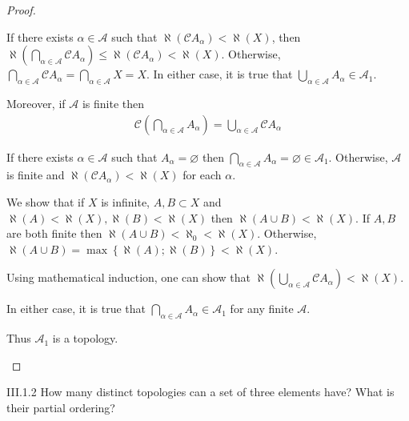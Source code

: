 \begin{proof}
\begin{enumerate}[label={(\alph*)},leftmargin=*]
		      If there exists \( \alpha \in \mathscr{A} \) such that \( \aleph(\mathscr{C}A_{\alpha}) < \aleph(X) \), then \( \aleph\left(\bigcap_{\alpha\in\mathscr{A}} \mathscr{C}A_{\alpha}\right) \le \aleph(\mathscr{C}A_{\alpha}) < \aleph(X) \). Otherwise, \( \bigcap_{\alpha\in\mathscr{A}} \mathscr{C}A_{\alpha} = \bigcap_{\alpha\in\mathscr{A}} X = X \). In either case, it is true that \( \bigcup_{\alpha\in\mathscr{A}} A_{\alpha} \in \mathscr{A}_{1} \).

		      Moreover, if \( \mathscr{A} \) is finite then
		      \begin{align*}
			      \mathscr{C}\left( \bigcap_{\alpha\in\mathscr{A}} A_{\alpha} \right) = \bigcup_{\alpha\in\mathscr{A}} \mathscr{C}A_{\alpha}
		      \end{align*}

		      If there exists \( \alpha \in \mathscr{A} \) such that \( A_{\alpha} = \varnothing \) then \( \bigcap_{\alpha\in\mathscr{A}} A_{\alpha} = \varnothing \in \mathscr{A}_{1} \). Otherwise, \( \mathscr{A} \) is finite and \( \aleph(\mathscr{C}A_{\alpha}) < \aleph(X) \) for each \( \alpha \).

		      We show that if \( X \) is infinite, \( A, B \subset X \) and \( \aleph(A) < \aleph(X), \aleph(B) < \aleph(X) \) then \( \aleph(A \cup B) < \aleph(X) \). If \( A, B \) are both finite then \( \aleph(A \cup B) < \aleph_{0} < \aleph(X) \). Otherwise, \( \aleph(A \cup B) = \max\left\{\aleph(A); \aleph(B)\right\} < \aleph(X) \).

		      Using mathematical induction, one can show that \( \aleph\left( \bigcup_{\alpha\in\mathscr{A}} \mathscr{C}A_{\alpha}\right) < \aleph(X) \).

		      In either case, it is true that \( \bigcap_{\alpha\in\mathscr{A}} A_{\alpha} \in \mathscr{A}_{1} \) for any finite \( \mathscr{A} \).

		      Thus \( \mathscr{A}_{1} \) is a topology.
	\end{enumerate}
\end{proof}

\begin{problem}{III.1.2}
How many distinct topologies can a set of three elements have? What is their partial ordering?
\end{problem}

